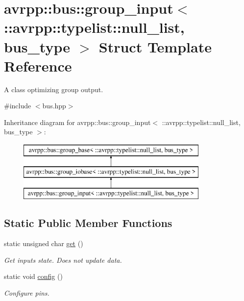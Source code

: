 \hypertarget{structavrpp_1_1bus_1_1group__input_3_01_1_1avrpp_1_1typelist_1_1null__list_00_01bus__type_01_4}{
\section{avrpp::bus::group\_\-input$<$ ::avrpp::typelist::null\_\-list, bus\_\-type $>$ Struct Template Reference}
\label{structavrpp_1_1bus_1_1group__input_3_01_1_1avrpp_1_1typelist_1_1null__list_00_01bus__type_01_4}
}


A class optimizing group output.  




{\ttfamily \#include $<$bus.hpp$>$}

Inheritance diagram for avrpp::bus::group\_\-input$<$ ::avrpp::typelist::null\_\-list, bus\_\-type $>$:\begin{figure}[H]
\begin{center}
\leavevmode
\includegraphics[height=3.000000cm]{structavrpp_1_1bus_1_1group__input_3_01_1_1avrpp_1_1typelist_1_1null__list_00_01bus__type_01_4}
\end{center}
\end{figure}
\subsection*{Static Public Member Functions}
\begin{DoxyCompactItemize}
\item 
static unsigned char \hyperlink{structavrpp_1_1bus_1_1group__input_3_01_1_1avrpp_1_1typelist_1_1null__list_00_01bus__type_01_4_a1ce0adb299d538ac0ebe2ad2bcd28d55}{get} ()
\begin{DoxyCompactList}\small\item\em Get inputs state. Does not update data. \item\end{DoxyCompactList}\item 
static void \hyperlink{structavrpp_1_1bus_1_1group__input_3_01_1_1avrpp_1_1typelist_1_1null__list_00_01bus__type_01_4_a52bd75a9a22345e164d88ab5fb6e0682}{config} ()
\begin{DoxyCompactList}\small\item\em Configure pins. \item\end{DoxyCompactList}\end{DoxyCompactItemize}


